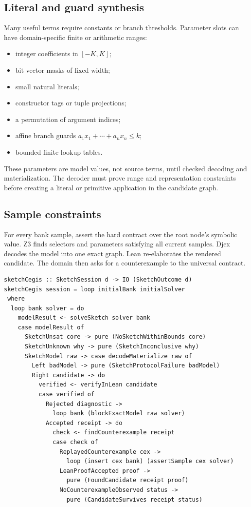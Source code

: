 \documentclass[11pt,oneside]{report}
\begin{document}
\subsection{Literal and guard synthesis}

Many useful terms require constants or branch thresholds. Parameter slots can have domain-specific finite or arithmetic ranges:

\begin{itemize}[leftmargin=2em]
\item integer coefficients in $[-K,K]$;
\item bit-vector masks of fixed width;
\item small natural literals;
\item constructor tags or tuple projections;
\item a permutation of argument indices;
\item affine branch guards $a_1x_1+\cdots+a_nx_n\le k$;
\item bounded finite lookup tables.
\end{itemize}

These parameters are model values, not source terms, until checked decoding and materialization. The decoder must prove range and representation constraints before creating a literal or primitive application in the candidate graph.

\subsection{Sample constraints}

For every bank sample, assert the hard contract over the root node's symbolic value. Z3 finds selectors and parameters satisfying all current samples. Djex decodes the model into one exact graph. Lean re-elaborates the rendered candidate. The domain then asks for a counterexample to the universal contract.

\begin{lstlisting}[language=HaskellX,caption={Typed-sketch CEGIS loop.},label={lst:sketch-cegis}]
sketchCegis :: SketchSession d -> IO (SketchOutcome d)
sketchCegis session = loop initialBank initialSolver
 where
  loop bank solver = do
    modelResult <- solveSketch solver bank
    case modelResult of
      SketchUnsat core -> pure (NoSketchWithinBounds core)
      SketchUnknown why -> pure (SketchInconclusive why)
      SketchModel raw -> case decodeMaterialize raw of
        Left badModel -> pure (SketchProtocolFailure badModel)
        Right candidate -> do
          verified <- verifyInLean candidate
          case verified of
            Rejected diagnostic ->
              loop bank (blockExactModel raw solver)
            Accepted receipt -> do
              check <- findCounterexample receipt
              case check of
                ReplayedCounterexample cex ->
                  loop (insert cex bank) (assertSample cex solver)
                LeanProofAccepted proof ->
                  pure (FoundCandidate receipt proof)
                NoCounterexampleObserved status ->
                  pure (CandidateSurvives receipt status)
\end{lstlisting}
\end{document}
